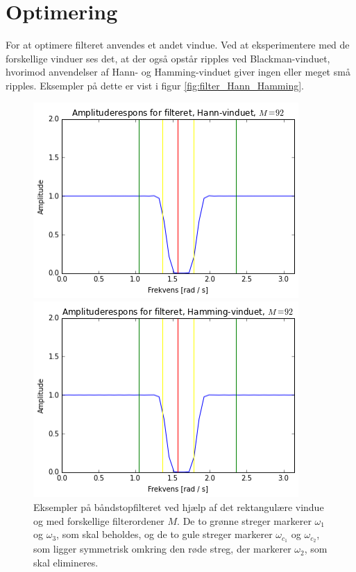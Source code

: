 \section{Optimering}
For at optimere filteret anvendes et andet vindue. Ved at eksperimentere med de forskellige vinduer ses det, at der også opstår ripples ved Blackman-vinduet, hvorimod anvendelser af Hann- og Hamming-vinduet giver ingen eller meget små ripples. Eksempler på dette er vist i figur \ref{fig:filter_Hann_Hamming}.
\begin{figure}[H]
\begin{minipage}{0.49\textwidth}
\includegraphics[width=0.9\textwidth]{figures/Filter_Hann_92.PNG}
\end{minipage}
\begin{minipage}{0.49\textwidth}
\includegraphics[width=0.9\textwidth]{figures/Filter_Hamming_92.PNG}
\end{minipage}
\caption{Eksempler på båndstopfilteret ved hjælp af det rektangulære vindue og med forskellige filterordener $M$. De to grønne streger markerer $\omega_1$ og $\omega_3$, som skal beholdes, og de to gule streger markerer $\omega_{c_1}$ og $\omega_{c_2}$, som ligger symmetrisk omkring den røde streg, der markerer $\omega_2$, som skal elimineres.}
\label{fig:filter_rekt}
\end{figure}